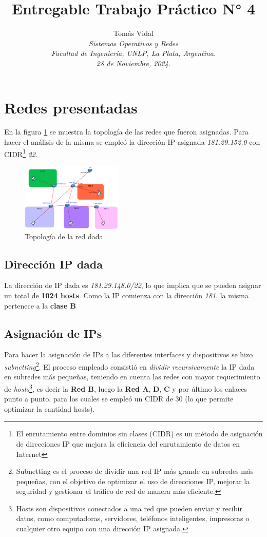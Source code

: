 \documentclass[letterpaper, 10 pt, conference]{ieeeconf}  %
\title{\LARGE \bf Entregable Trabajo Práctico N° 4}
\author{
  Tom\'as Vidal\\
  {\it Sistemas Operativos y Redes}\\
  {\it Facultad de Ingenier\'ia, UNLP, La Plata, Argentina.}\\
  {\it 28 de Noviembre, 2024.}
}                                            %
\begin{document}
\maketitle
\thispagestyle{empty}
\pagestyle{empty}

\section{Redes presentadas}
En la figura \ref{fig:red_dada} se muestra la topología de las redes que fueron asignadas. Para hacer el análisis de la misma se empleó la dirección IP asignada \textit{181.29.152.0} con CIDR\footnote{El enrutamiento entre dominios sin clases (CIDR) es un método de asignación de direcciones IP que mejora la eficiencia del enrutamiento de datos en Internet} \textit{22}.

\begin{figure}[H]
	\centering
	\includegraphics[width=0.43\textwidth]{./Imagenes/red_topologia.png}
	\caption{Topología de la red dada}
	\label{fig:red_dada}
\end{figure}

\subsection{Dirección IP dada}
La dirección de IP dada es \textit{181.29.148.0/22}, lo que implica que se pueden asignar un total de \textbf{1024 hosts}. Como la IP comienza con la dirección \textit{181}, la misma pertenece a la \textbf{clase B}

\subsection{Asignación de IPs}

Para hacer la asignación de IPs a las diferentes interfaces y dispositivos se hizo \textit{subnetting}\footnote{Subnetting es el proceso de dividir una red IP más grande en subredes más pequeñas, con el objetivo de optimizar el uso de direcciones IP, mejorar la seguridad y gestionar el tráfico de red de manera más eficiente.}. El proceso empleado consistió en \textit{dividir recursivamente} la IP dada en subredes más pequeñas, teniendo en cuenta las redes con mayor requerimiento de \textit{hosts}\footnote{Hosts son dispositivos conectados a una red que pueden enviar y recibir datos, como computadoras, servidores, teléfonos inteligentes, impresoras o cualquier otro equipo con una dirección IP asignada.}, es decir la \textbf{Red B}, luego la \textbf{Red A}, \textbf{D}, \textbf{C} y por último los enlaces punto a punto, para los cuales se empleó un CIDR de 30 (lo que permite optimizar la cantidad hosts).
\end{document}
